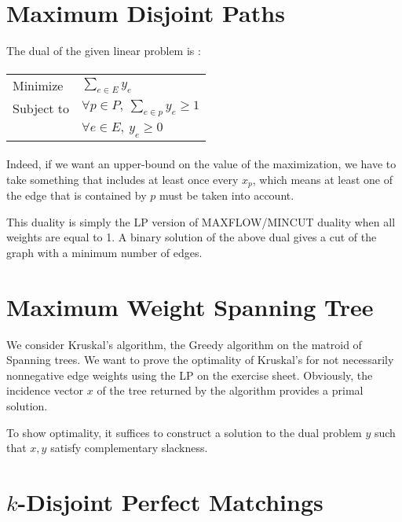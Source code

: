 \documentclass{scrartcl}
\newcommand\1{\mathbf{1}}
\begin{document}
\section{Maximum Disjoint Paths}

The dual of the given linear problem is :

\paragraph{}
\begin{tabular}{ll}
Minimize & $\sum_{e \in E} y_e$\\
Subject to & $\forall p \in P, \ \sum_{e \in p} y_e \geq 1$\\
& $\forall e \in E, \  y_e \geq 0$ \\
\end{tabular}
\paragraph{} 

Indeed, if we want an upper-bound on the value of the maximization, we have to take something that includes at least once every $x_p$, which means at least one of the edge that is contained by $p$ must be taken into account. 

This duality is simply the LP version of MAXFLOW/MINCUT duality when all weights are equal to 1. A binary solution of the above dual gives a cut of the graph with a minimum number of edges.

\section{Maximum Weight Spanning Tree}
We consider Kruskal's algorithm, the Greedy algorithm on the matroid of Spanning trees. We want to prove the optimality of Kruskal's for not necessarily nonnegative edge weights using the LP on the exercise sheet. Obviously, the incidence vector $x$ of the tree returned by the algorithm provides a primal solution.

To show optimality, it suffices to construct a solution to the dual problem $y$ such that $x,y$ satisfy complementary slackness.








\section{$k$-Disjoint Perfect Matchings}
\end{document}
